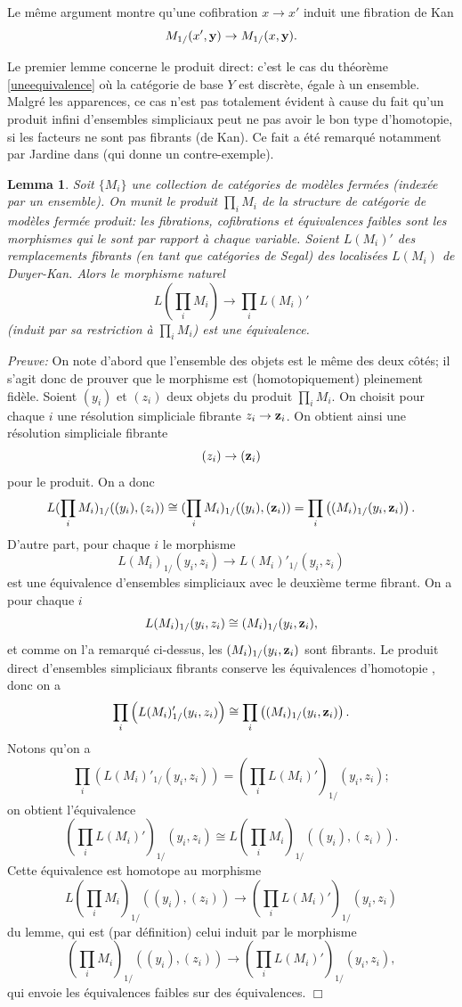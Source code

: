 \documentclass[12pt]{article}
\newcommand{\eop}{\hfill $\Box$\vspace{.1in}}
\newtheorem{lemma}{Lemma}[section]
\begin{document}
Le m\^eme argument montre qu'une cofibration $x\rightarrow x'$ induit une
fibration de Kan
$$
M_{1/}(x', {\bf y})\rightarrow M_{1/}(x, {\bf y}).
$$


Le premier lemme concerne le produit direct: c'est le cas du th\'eor\`eme
\ref{uneequivalence} o\`u la cat\'egorie de base $Y$ est discr\`ete, \'egale
\`a un ensemble. Malgr\'e
les apparences, ce cas n'est pas totalement \'evident \`a
cause du fait qu'un produit infini d'ensembles simpliciaux peut ne pas avoir le
bon type d'homotopie, si les facteurs ne sont pas fibrants (de Kan). Ce fait a
\'et\'e remarqu\'e notamment par Jardine dans \cite{JardineBool} (qui donne un
contre-exemple).

\begin{lemma}
\label{equivalence1}
Soit $\{ M_i\}$ une collection de cat\'egories de mod\`eles
ferm\'ees (index\'ee par un ensemble). On munit le produit $\prod _i M_i$
de la structure de cat\'egorie de mod\`eles ferm\'ee produit: les fibrations,
cofibrations et \'equivalences faibles sont les morphismes qui le sont
par rapport \`a
chaque variable.  Soient $L(M_i)'$ des remplacements fibrants (en tant que
cat\'egories de Segal) des localis\'ees $L(M_i)$ de Dwyer-Kan.
Alors le morphisme naturel
$$
L(\prod _i M_i)\rightarrow \prod _i L(M_i)'
$$
(induit par sa restriction \`a $\prod _i M_i$) est une \'equivalence.
\end{lemma}
{\em Preuve:}
On note d'abord que l'ensemble des objets est le m\^eme des deux c\^ot\'es;
il s'agit donc de prouver que le morphisme est (homotopiquement) pleinement
fid\`ele. Soient $(y_i)$ et $(z_i)$ deux objets du produit $\prod _i M_i$.
On choisit pour chaque $i$ une r\'esolution simpliciale fibrante $z_i
\rightarrow
{\bf z}_i$.  On obtient ainsi une r\'esolution simpliciale fibrante
$$
(z_i)\rightarrow ({\bf z}_i)
$$
pour le produit. On a donc
$$
L(\prod _i M_i) _{1/}((y_i), (z_i))\cong
(\prod _i M_i)_{1/}((y_i), ({\bf z}_i)) = \prod _i \left(
(M_i)_{1/}(y_i,{\bf z}_i)\right) .
$$
D'autre part, pour chaque $i$ le morphisme
$$
L(M_i)_{1/}(y_i, z_i)\rightarrow L(M_i)'_{1/}(y_i,z_i)
$$
est une \'equivalence d'ensembles simpliciaux avec le deuxi\`eme terme fibrant.
On a  pour chaque $i$
$$
L(M_i)_{1/}(y_i, z_i)\cong (M_i)_{1/}(y_i,{\bf z}_i),
$$
et comme on l'a remarqu\'e ci-dessus, les
$(M_i)_{1/}(y_i,{\bf z}_i)$ sont fibrants. Le produit direct d'ensembles
simpliciaux fibrants conserve les \'equivalences d'homotopie
\cite{JardineBool}, donc on a
$$
\prod _i \left(L(M_i)'_{1/}(y_i, z_i)\right) \cong \prod _i \left(
(M_i)_{1/}(y_i,{\bf z}_i)\right) .
$$
Notons qu'on a
$$
\prod _i \left(L(M_i)'_{1/}(y_i, z_i)\right) =
(\prod _i L(M_i)')_{1/}(y_i, z_i);
$$
on obtient l'\'equivalence
$$
(\prod _i L(M_i)')_{1/}(y_i, z_i)\cong
L(\prod _i M_i) _{1/}((y_i), (z_i)).
$$
Cette \'equivalence est homotope au morphisme
$$
L(\prod _i M_i) _{1/}((y_i), (z_i))\rightarrow
(\prod _i L(M_i)')_{1/}(y_i, z_i)
$$
du lemme, qui est (par d\'efinition) celui induit par le morphisme
$$
(\prod _i M_i) _{1/}((y_i), (z_i))\rightarrow
(\prod _i L(M_i)')_{1/}(y_i, z_i),
$$
qui envoie les \'equivalences faibles sur des \'equivalences.
\eop
\end{document}
